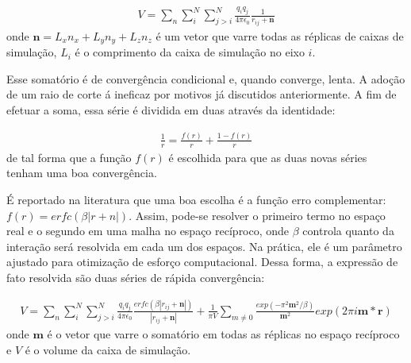 \begin{equation}
\begin{aligned}
V = \sum_n \sum_{i}^N \sum_{j>i}^N \frac{q_i q_j}{4\pi \epsilon_0} \frac{1}{r_{ij} + \mathbf{n}}
\end{aligned}
\end{equation}
onde $\mathbf{n}=L_x n_x + L_y n_y + L_z n_z$ é um vetor que varre todas as réplicas de caixas de simulação, $L_i$ é o comprimento da caixa de simulação no eixo $i$.

Esse somatório é de convergência condicional e, quando converge, lenta. 
A adoção de um raio de corte á ineficaz por motivos já discutidos anteriormente. 
A fim de efetuar a soma, essa série é dividida em duas  através da identidade\cite{Leach2001}:

\begin{equation}
\begin{aligned}
\frac{1}{r} = \frac{f(r)}{r} + \frac{1-f(r)}{r}
\end{aligned}
\end{equation}
de tal forma que a função $f(r)$ é escolhida para que as duas novas séries tenham uma boa convergência.

É reportado na literatura que uma boa escolha é a função erro complementar: $f(r) = erfc(\beta |r+n|)$.
Assim, pode-se resolver o primeiro termo no espaço real e o segundo em uma malha no espaço recíproco, onde $\beta$ controla quanto da interação será resolvida em cada um dos espaços.
Na prática, ele é um parâmetro ajustado para otimização de esforço computacional.
Dessa forma, a expressão de fato resolvida são duas séries de rápida convergência\cite{Darden1993, Essmann1995}:

\begin{equation}
\begin{aligned}
V = \sum_n \sum_{i}^N \sum_{j>i}^N \frac{q_i q_j}{4\pi \epsilon_0} \frac{erfc(\beta |r_{ij}+\mathbf{n}|)}{|r_{ij} + \mathbf{n}|} + \frac{1}{\pi V} \sum_{m \neq 0} \frac{exp(-\pi^2 \mathbf{m}^2/\beta)}{\mathbf{m}^2}exp(2\pi i \mathbf{m} * \mathbf{r})
\end{aligned}
\end{equation}
onde $\mathbf{m}$ é o vetor que varre o somatório em todas as réplicas no espaço recíproco e $V$ é o volume da caixa de simulação.

